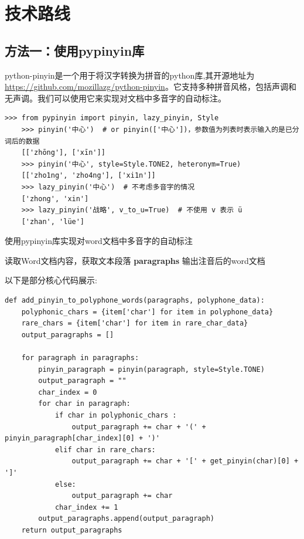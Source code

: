\documentclass[12pt,hyperref,a4paper,UTF8]{ctexart}
\begin{document}
\section{技术路线}
\subsection{方法一：使用pypinyin库}
python-pinyin是一个用于将汉字转换为拼音的python库,其开源地址为\url{https://github.com/mozillazg/python-pinyin}。它支持多种拼音风格，包括声调和无声调。我们可以使用它来实现对文档中多音字的自动标注。
\begin{lstlisting}[caption={pypinyin库的基础用法}, label={lst1}]
    >>> from pypinyin import pinyin, lazy_pinyin, Style
    >>> pinyin('中心')  # or pinyin(['中心'])，参数值为列表时表示输入的是已分词后的数据
    [['zhōng'], ['xīn']]
    >>> pinyin('中心', style=Style.TONE2, heteronym=True)
    [['zho1ng', 'zho4ng'], ['xi1n']]
    >>> lazy_pinyin('中心')  # 不考虑多音字的情况
    ['zhong', 'xin']
    >>> lazy_pinyin('战略', v_to_u=True)  # 不使用 v 表示 ü
    ['zhan', 'lüe']
\end{lstlisting}
\begin{algorithm}[H]
    \caption{使用pypinyin库实现对word文档中多音字的自动标注}
    
    
    
    \BlankLine
    读取Word文档内容，获取文本段落 \textbf{paragraphs}\;
    输出注音后的word文档\;
\end{algorithm}
\vspace{\baselineskip}
以下是部分核心代码展示:
\begin{lstlisting}[caption={pypinyin库的基础用法}, label={lst2}]
    def add_pinyin_to_polyphone_words(paragraphs, polyphone_data):
    polyphonic_chars = {item['char'] for item in polyphone_data}
    rare_chars = {item['char'] for item in rare_char_data}
    output_paragraphs = []

    for paragraph in paragraphs:
        pinyin_paragraph = pinyin(paragraph, style=Style.TONE)
        output_paragraph = ""
        char_index = 0
        for char in paragraph:
            if char in polyphonic_chars :
                output_paragraph += char + '(' + pinyin_paragraph[char_index][0] + ')'
            elif char in rare_chars:
                output_paragraph += char + '[' + get_pinyin(char)[0] + ']'
            else:
                output_paragraph += char
            char_index += 1
        output_paragraphs.append(output_paragraph)
    return output_paragraphs
\end{lstlisting}
\end{document}
